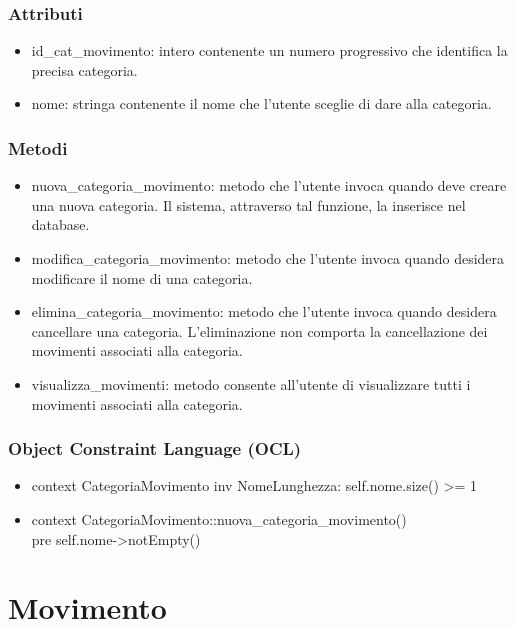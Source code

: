 \documentclass[a4paper,12pt]{article}
\begin{document}
\subsubsection*{Attributi}
\begin{itemize} \setlength\itemsep{0.01em}
\item {\ttfamily id\_cat\_movimento}: intero contenente un numero progressivo che identifica la precisa categoria.
\item {\ttfamily nome}: stringa contenente il nome che l'utente sceglie di dare alla categoria.
\end{itemize}
\subsubsection*{Metodi}
\begin{itemize} \setlength\itemsep{0.01em}
\item {\ttfamily nuova\_categoria\_movimento}: metodo che l'utente invoca quando deve creare una nuova categoria. Il sistema, attraverso tal funzione, la inserisce nel database.
\item {\ttfamily modifica\_categoria\_movimento}: metodo che l'utente invoca quando desidera modificare il nome di una categoria.
\item {\ttfamily elimina\_categoria\_movimento}: metodo che l'utente invoca quando desidera cancellare una categoria. L'eliminazione non comporta la cancellazione dei movimenti associati alla categoria.
\item {\ttfamily visualizza\_movimenti}: metodo consente all'utente di visualizzare tutti i movimenti associati alla categoria.
\end{itemize}
\subsubsection*{Object Constraint Language (OCL)}
\begin{itemize}
\item {\ttfamily context CategoriaMovimento inv NomeLunghezza: self.nome.size() >= 1}
\item {\ttfamily context CategoriaMovimento::nuova\_categoria\_movimento() \\pre self.nome->notEmpty()}

\end{itemize}
\section{Movimento}
\end{document}
